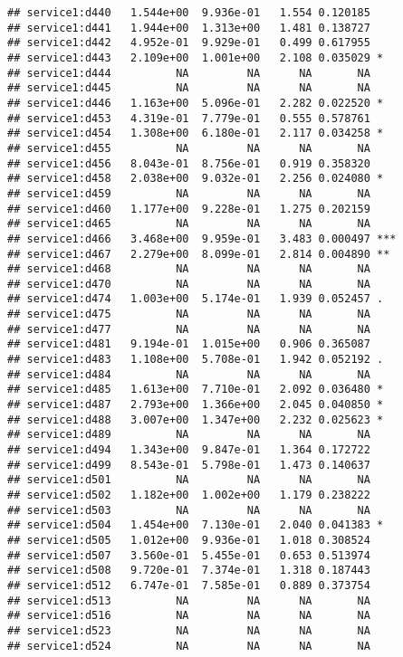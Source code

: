 \documentclass[
]{article}
\begin{document}
\begin{verbatim}
## service1:d440   1.544e+00  9.936e-01   1.554 0.120185    
## service1:d441   1.944e+00  1.313e+00   1.481 0.138727    
## service1:d442   4.952e-01  9.929e-01   0.499 0.617955    
## service1:d443   2.109e+00  1.001e+00   2.108 0.035029 *  
## service1:d444          NA         NA      NA       NA    
## service1:d445          NA         NA      NA       NA    
## service1:d446   1.163e+00  5.096e-01   2.282 0.022520 *  
## service1:d453   4.319e-01  7.779e-01   0.555 0.578761    
## service1:d454   1.308e+00  6.180e-01   2.117 0.034258 *  
## service1:d455          NA         NA      NA       NA    
## service1:d456   8.043e-01  8.756e-01   0.919 0.358320    
## service1:d458   2.038e+00  9.032e-01   2.256 0.024080 *  
## service1:d459          NA         NA      NA       NA    
## service1:d460   1.177e+00  9.228e-01   1.275 0.202159    
## service1:d465          NA         NA      NA       NA    
## service1:d466   3.468e+00  9.959e-01   3.483 0.000497 ***
## service1:d467   2.279e+00  8.099e-01   2.814 0.004890 ** 
## service1:d468          NA         NA      NA       NA    
## service1:d470          NA         NA      NA       NA    
## service1:d474   1.003e+00  5.174e-01   1.939 0.052457 .  
## service1:d475          NA         NA      NA       NA    
## service1:d477          NA         NA      NA       NA    
## service1:d481   9.194e-01  1.015e+00   0.906 0.365087    
## service1:d483   1.108e+00  5.708e-01   1.942 0.052192 .  
## service1:d484          NA         NA      NA       NA    
## service1:d485   1.613e+00  7.710e-01   2.092 0.036480 *  
## service1:d487   2.793e+00  1.366e+00   2.045 0.040850 *  
## service1:d488   3.007e+00  1.347e+00   2.232 0.025623 *  
## service1:d489          NA         NA      NA       NA    
## service1:d494   1.343e+00  9.847e-01   1.364 0.172722    
## service1:d499   8.543e-01  5.798e-01   1.473 0.140637    
## service1:d501          NA         NA      NA       NA    
## service1:d502   1.182e+00  1.002e+00   1.179 0.238222    
## service1:d503          NA         NA      NA       NA    
## service1:d504   1.454e+00  7.130e-01   2.040 0.041383 *  
## service1:d505   1.012e+00  9.936e-01   1.018 0.308524    
## service1:d507   3.560e-01  5.455e-01   0.653 0.513974    
## service1:d508   9.720e-01  7.374e-01   1.318 0.187443    
## service1:d512   6.747e-01  7.585e-01   0.889 0.373754    
## service1:d513          NA         NA      NA       NA    
## service1:d516          NA         NA      NA       NA    
## service1:d523          NA         NA      NA       NA    
## service1:d524          NA         NA      NA       NA    

\end{verbatim}
\end{document}
